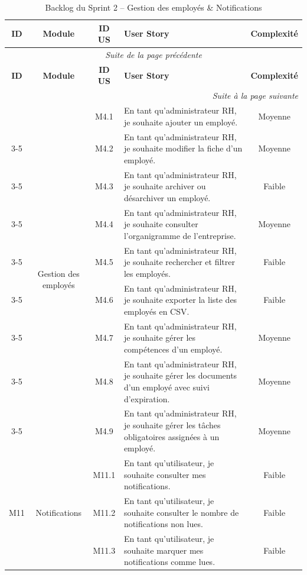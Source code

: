 
\begin{longtable}{|c|c|c|p{7.2cm}|c|}
\caption{Backlog du Sprint 2 -- Gestion des employés \& Notifications} \label{tab:backlog-sprint-2} \\
\hline
\textbf{ID} & \textbf{Module} & \textbf{ID US} & \textbf{User Story} & \textbf{Complexité} \\
\hline
\endfirsthead

\multicolumn{5}{c}{\textit{Suite de la page précédente}} \\
\hline
\textbf{ID} & \textbf{Module} & \textbf{ID US} & \textbf{User Story} & \textbf{Complexité} \\
\hline
\endhead

\hline \multicolumn{5}{r}{\textit{Suite à la page suivante}} \\
\endfoot

\hline
\endlastfoot

\multirow{9}{*}{M4} & \multirow{9}{*}{Gestion des employés} & M4.1 & En tant qu'administrateur RH, je souhaite ajouter un employé. & Moyenne \\
\cline{3-5}
 & & M4.2 & En tant qu'administrateur RH, je souhaite modifier la fiche d'un employé. & Moyenne \\
\cline{3-5}
 & & M4.3 & En tant qu'administrateur RH, je souhaite archiver ou désarchiver un employé. & Faible \\
\cline{3-5}
 & & M4.4 & En tant qu'administrateur RH, je souhaite consulter l'organigramme de l'entreprise. & Moyenne \\
\cline{3-5}
 & & M4.5 & En tant qu'administrateur RH, je souhaite rechercher et filtrer les employés. & Faible \\
\cline{3-5}
 & & M4.6 & En tant qu'administrateur RH, je souhaite exporter la liste des employés en CSV. & Faible \\
\cline{3-5}
 & & M4.7 & En tant qu'administrateur RH, je souhaite gérer les compétences d'un employé. & Moyenne \\
\cline{3-5}
 & & M4.8 & En tant qu'administrateur RH, je souhaite gérer les documents d'un employé avec suivi d'expiration. & Moyenne \\
\cline{3-5}
 & & M4.9 & En tant qu'administrateur RH, je souhaite gérer les tâches obligatoires assignées à un employé. & Moyenne \\
\hline
\multirow{3}{*}{M11} & \multirow{3}{*}{Notifications} & M11.1 & En tant qu'utilisateur, je souhaite consulter mes notifications. & Faible \\
\cline{3-5}
 & & M11.2 & En tant qu'utilisateur, je souhaite consulter le nombre de notifications non lues. & Faible \\
\cline{3-5}
 & & M11.3 & En tant qu'utilisateur, je souhaite marquer mes notifications comme lues. & Faible \\
\hline
\end{longtable}
